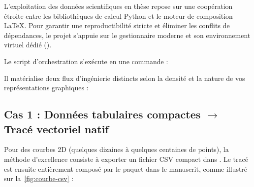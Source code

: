 L'exploitation des données scientifiques en thèse repose sur une coopération étroite
entre les bibliothèques de calcul Python et le moteur de composition \LaTeX{}.
Pour garantir une reproductibilité stricte et éliminer les conflits de dépendances,
le projet s'appuie sur le gestionnaire moderne  et son environnement virtuel dédié ().

Le script d'orchestration  s'exécute en une commande :
\begin{center}
\end{center}

Il matérialise deux flux d'ingénierie distincts selon la densité et la nature de vos représentations graphiques :

\subsection[Cas 1 : Données tabulaires compactes vers Tracé vectoriel natif]{Cas 1 : Données tabulaires compactes \texorpdfstring{$\to$}{vers} Tracé vectoriel natif \texorpdfstring{}{pgfplots}}
\label{subsec:cas1-pgfplots}

Pour des courbes 2D (quelques dizaines à quelques centaines de points),
la méthode d'excellence consiste à exporter un fichier CSV compact dans .
Le tracé est ensuite entièrement composé par le paquet  dans le manuscrit,
comme illustré sur la~\cref{fig:courbe-csv} :

